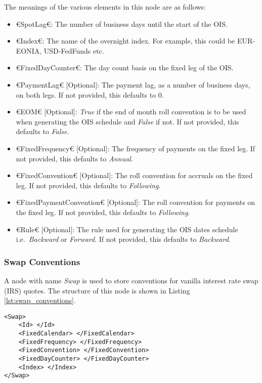 The meanings of the various elements in this node are as follows:
\begin{itemize}
\item €SpotLag€: The number of business days until the start of the OIS.
\item €Index€: The name of the overnight index. For example, this could be EUR-EONIA, USD-FedFunds etc.
\item €FixedDayCounter€: The day count basis on the fixed leg of the OIS.
\item €PaymentLag€ [Optional]: The payment lag, as a number of business days, on both legs. If not provided, this defaults 
to 0.
\item €EOM€ [Optional]: \emph{True} if the end of month roll convention is to be used when generating the OIS schedule and 
\emph{False} if not. If not provided, this defaults to \emph{False}.
\item €FixedFrequency€ [Optional]: The frequency of payments on the fixed leg. If not provided, this defaults to 
\emph{Annual}.
\item €FixedConvention€ [Optional]: The roll convention for accruals on the fixed leg. If not provided, this defaults to 
\emph{Following}.
\item €FixedPaymentConvention€ [Optional]: The roll convention for payments on the fixed leg. If not provided, this defaults 
to \emph{Following}.
\item €Rule€ [Optional]: The rule used for generating the OIS dates schedule i.e.\ \emph{Backward} or \emph{Forward}. If not 
provided, this defaults to \emph{Backward}.
\end{itemize}

\subsubsection{Swap Conventions}
A node with name \emph{Swap} is used to store conventions for vanilla interest rate swap (IRS) quotes. The structure of 
this node is shown in Listing \ref{lst:swap_conventions}.

{\footnotesize
\begin{lstlisting}[caption={Swap conventions}, label=lst:swap_conventions]
<Swap>
	<Id> </Id>
	<FixedCalendar> </FixedCalendar>
	<FixedFrequency> </FixedFrequency>
	<FixedConvention> </FixedConvention>
	<FixedDayCounter> </FixedDayCounter>
	<Index> </Index>
</Swap>
\end{lstlisting}
}

